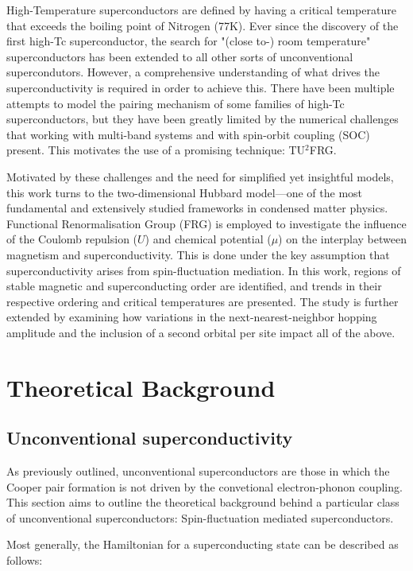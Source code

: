 \documentclass[12pt]{article}
\begin{document}
\noindent High-Temperature superconductors are defined by having a critical temperature that exceeds the boiling point 
of Nitrogen (77K). Ever since the discovery of the first high-Tc superconductor\cite{bednorz1986possible}, the search for "(close to-) room temperature" superconductors has been extended to 
all other sorts of unconventional supercondutors. However, a comprehensive understanding of what drives the superconductivity is required in order 
to achieve this. There have been multiple attempts to model the pairing mechanism of some families of high-Tc superconductors, but they have
been greatly limited by the numerical challenges that working with multi-band systems and with spin-orbit coupling (SOC) present. 
This motivates the use of a promising technique: TU$^2$FRG\cite{eckhardt2020truncated,profe2024magic}.\par

\medskip

\noindent Motivated by these challenges and the need for simplified yet insightful models, this work turns to the two-dimensional Hubbard model—one of the most fundamental 
and extensively studied frameworks in condensed matter physics. Functional Renormalisation Group (FRG) is employed to 
investigate the influence of the Coulomb repulsion ($U$) and chemical potential ($\mu$) on the
interplay between magnetism and superconductivity.
This is done under the key assumption that superconductivity arises from spin-fluctuation mediation.
In this work, regions of stable magnetic and superconducting order are identified, and trends in their respective ordering and critical temperatures are presented.
The study is further extended by examining how variations in the next-nearest-neighbor hopping amplitude and the inclusion of a second orbital per site impact all of the above.




\section{Theoretical Background}

\subsection{Unconventional superconductivity}

As previously outlined, unconventional superconductors are those in which the Cooper pair formation is not driven by the convetional electron-phonon coupling. 
This section aims to outline the theoretical background behind a particular class of unconventional superconductors: Spin-fluctuation mediated superconductors. \par
\medskip
\noindent Most generally, the Hamiltonian for a superconducting state can be described as follows:
\end{document}
